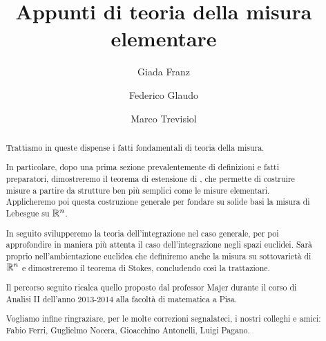 \documentclass[a4paper,12pt]{article}
\title{Appunti di teoria della misura elementare}
\author{Giada Franz \and Federico Glaudo \and Marco Trevisiol}
\begin{document}
\maketitle

\begin{abstract}
	Trattiamo in queste dispense i fatti fondamentali di teoria della misura.
	
	In particolare, dopo una prima sezione prevalentemente di definizioni e fatti preparatori, dimostreremo il teorema di estensione di \carat{}, che permette di costruire misure a partire da strutture ben più semplici come le misure elementari. Applicheremo poi questa costruzione generale per fondare su solide basi la misura di Lebesgue su $\mathbb R^n$.
	
	In seguito svilupperemo la teoria dell'integrazione nel caso generale, per poi approfondire in maniera più attenta il caso dell'integrazione negli spazi euclidei. Sarà proprio nell'ambientazione euclidea che definiremo anche la misura su sottovarietà di $\mathbb R^n$ e dimostreremo il teorema di Stokes, concludendo così la trattazione.
	
	Il percorso seguito ricalca quello proposto dal professor Majer durante il corso di Analisi II dell'anno 2013-2014 alla facoltà di matematica a Pisa.
	
	Vogliamo infine ringraziare, per le molte correzioni segnalateci, i nostri colleghi e amici: Fabio Ferri, Guglielmo Nocera, Gioacchino Antonelli, Luigi Pagano.
\end{abstract}
\clearpage

\tableofcontents
\clearpage











\printindex
\end{document}
